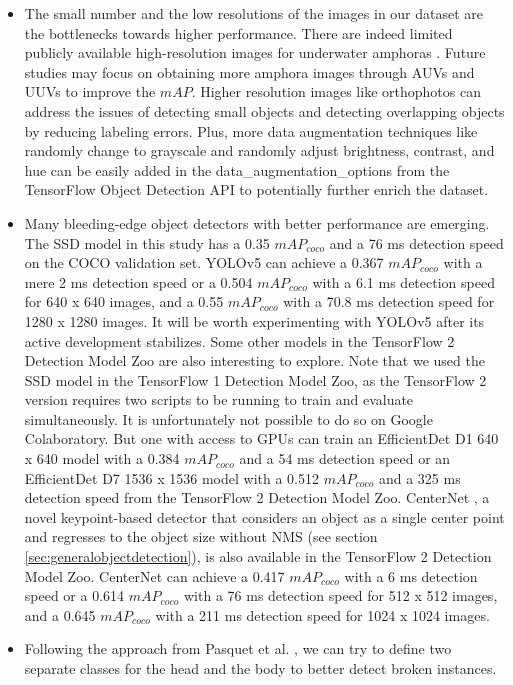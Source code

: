 \documentclass[a4paper, 11pt, oneside]{article}
\begin{document}
\begin{itemize}
  \item The small number and the low resolutions of the images in our dataset are the bottlenecks towards higher
  performance. There are indeed limited publicly available high-resolution images for underwater amphoras
  \cite{pasquet2017amphora}. Future studies may focus on obtaining more amphora images through AUVs and UUVs to improve
  the $mAP$. Higher resolution images like orthophotos can address the issues of detecting small objects
  \cite{kisantal2019augmentation} and detecting overlapping objects by reducing labeling errors. Plus, more data
  augmentation techniques like randomly change to grayscale and randomly adjust brightness, contrast, and hue can be
  easily added in the data\_augmentation\_options from the TensorFlow Object Detection API to potentially further enrich
  the dataset.
  \item Many bleeding-edge object detectors with better performance are emerging. The SSD model in this study
  has a 0.35 $mAP_{coco}$ and a 76 ms detection speed on the COCO validation set. YOLOv5 can achieve a 0.367
  $mAP_{coco}$ with a mere 2 ms detection speed or a 0.504 $mAP_{coco}$ with a 6.1 ms detection speed for 640 x 640 images,
  and a 0.55 $mAP_{coco}$ with a 70.8 ms detection speed for 1280 x 1280 images. It will be worth experimenting with
  YOLOv5 after its active development stabilizes. Some other models in the TensorFlow 2 Detection Model Zoo
  \cite{tf2detectionmodelzoo} are also interesting to explore. Note that we used the SSD model in the TensorFlow 1
  Detection Model Zoo, as the TensorFlow 2 version requires two scripts to be running to train and evaluate simultaneously.
  It is unfortunately not possible to do so on Google Colaboratory. But one with access to GPUs can train an EfficientDet
  \cite{tan2020efficientdet} D1 640 x 640 model with a 0.384 $mAP_{coco}$ and a 54 ms detection speed or an EfficientDet
  D7 1536 x 1536 model with a 0.512 $mAP_{coco}$ and a 325 ms detection speed from the TensorFlow 2 Detection Model Zoo.
  CenterNet \cite{zhou2019objects}, a novel keypoint-based detector that considers an object as a single center point and
  regresses to the object size without NMS (see section \ref{sec:generalobjectdetection}), is also available in the
  TensorFlow 2 Detection Model Zoo. CenterNet can achieve a 0.417 $mAP_{coco}$ with a 6 ms detection speed or a 0.614
  $mAP_{coco}$ with a 76 ms detection speed for 512 x 512 images, and a 0.645 $mAP_{coco}$ with a 211 ms detection speed
  for 1024 x 1024 images.
  \item Following the approach from Pasquet et al. \cite{pasquet2017amphora}, we can try to define two separate classes
  for the head and the body to better detect broken instances.
\end{itemize}

\newpage

\printbibliography
\end{document}

